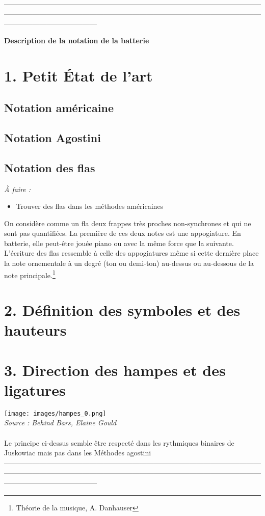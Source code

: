 —————————————————————————————————————————————————————————————————————————————————————
\begin{center}
	\textbf{\LARGE{Description de la notation de la batterie}}
\end{center}
\section*{1. Petit État de l’art}
\subsection*{Notation américaine}
\subsection*{Notation Agostini}

\subsection*{Notation des flas}
\textit{À faire :}
\begin{itemize}
	\item Trouver des flas dans les méthodes américaines\\
\end{itemize}
On considère comme un fla deux frappes très proches non-synchrones et qui ne sont pas quantifiées. La première de ces deux notes est une appogiature. En batterie, elle peut-être jouée piano ou avec la même force que la suivante.
L’écriture des flas ressemble à celle des appogiatures même si cette dernière place la note ornementale à un degré (ton ou demi-ton) au-dessus ou au-dessous de la note principale.\footnote{Théorie de la musique, A. Danhauser}
\section*{2. Définition des symboles et des hauteurs}
\section*{3. Direction des hampes et des ligatures}
\texttt{[image: images/hampes\_0.png]} \\\textit{Source : Behind Bars, Elaine Gould}\\\\
Le principe ci-dessus semble être respecté dans les rythmiques binaires de Juskowiac mais pas dans les Méthodes agostini\\
—————————————————————————————————————————————————————————————————————————————————————